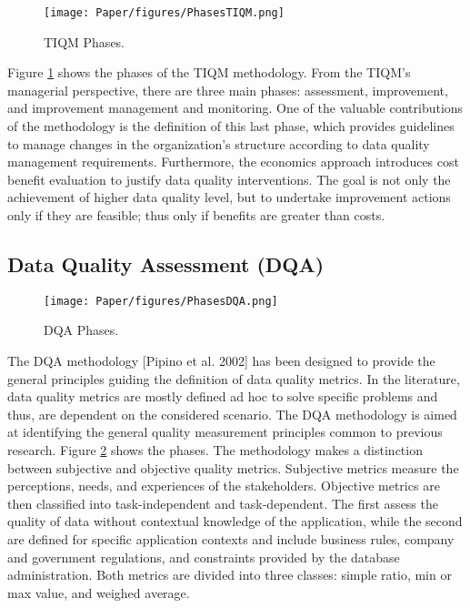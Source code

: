 \documentclass[pdftex,english,oribibl]{llncs}
\begin{document}
\begin{figure}
    \centering
    \texttt{[image: Paper/figures/PhasesTIQM.png]}
    \caption{TIQM Phases.}
    \label{fig:PhasesTIQM}
 \end{figure}

Figure \ref{fig:PhasesTIQM} shows the phases of the TIQM methodology.
From the TIQM's managerial perspective, there are three main phases: assessment, improvement, and improvement management and monitoring.
One of the valuable contributions of the methodology is the definition of this last phase, which provides guidelines to manage changes in the organization’s structure according to data quality management requirements.
Furthermore, the economics approach introduces cost benefit evaluation to justify data quality interventions.
The goal is not only the achievement of higher data quality level, but to undertake improvement actions only if they are feasible; thus only if benefits are greater than costs.

\subsection{Data Quality Assessment (DQA)}
\begin{figure}
    \centering
    \texttt{[image: Paper/figures/PhasesDQA.png]}
    \caption{DQA Phases.}
    \label{fig:PhasesDQA}
 \end{figure}

The DQA methodology [Pipino et al. 2002] has been designed to provide the general principles guiding the definition of data quality metrics. In the literature, data quality metrics are mostly defined ad hoc to solve specific problems and thus, are dependent on the considered scenario. The DQA methodology is aimed at identifying the general quality measurement principles common to previous research. Figure \ref{fig:PhasesDQA} shows the phases.
The methodology makes a distinction between subjective and objective quality metrics. Subjective metrics measure the perceptions, needs, and experiences of the stakeholders. Objective metrics are then classified into task-independent and task-dependent. The first assess the quality of data without contextual knowledge of the application, while the second are defined for specific application contexts and include business rules, company and government regulations, and constraints provided by the database administration. Both metrics are divided into three classes: simple ratio, min or max value, and weighed average.
\end{document}
